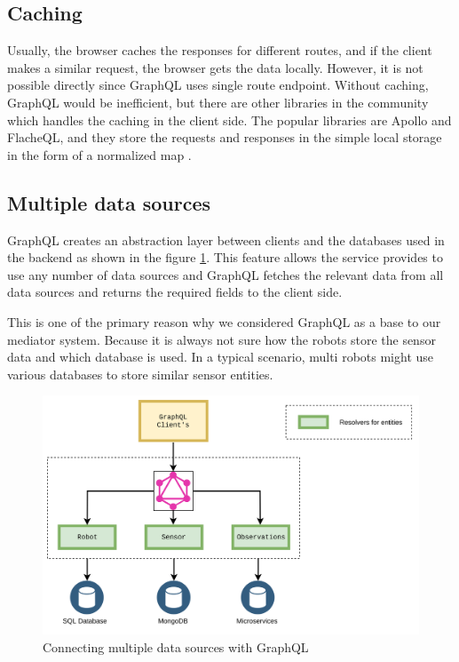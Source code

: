 	\subsection{Caching}
	Usually, the browser caches the responses for different routes, and if the client makes a similar request, the browser gets the data locally. However, it is not possible directly since GraphQL uses single route endpoint. Without caching, GraphQL would be inefficient, but there are other libraries in the community which handles the caching in the client side. The popular libraries are Apollo and FlacheQL, and they store the requests and responses in the simple local storage in the form of a normalized map \cite{misc02}.
	
	\subsection{Multiple data sources}
	GraphQL creates an abstraction layer between clients and the databases used in the backend as shown in the figure \ref{fig:multiple_db_support}. This feature allows the service provides to use any number of data sources and GraphQL fetches the relevant data from all data sources and returns the required fields to the client side. 
	
	This is one of the primary reason why we considered GraphQL as a base to our mediator system. Because it is always not sure how the robots store the sensor data and which database is used. In a typical scenario, multi robots might use various databases to store similar sensor entities.

	\begin{figure}[!htbp] 
		\begin{center}
			\includegraphics[trim={0 0 0 2cm},clip,scale=0.07]{./images/png/multiple_db_support}	
			\caption{ Connecting multiple data sources with GraphQL}	
			\label{fig:multiple_db_support}	
		\end{center}
	\end{figure}

